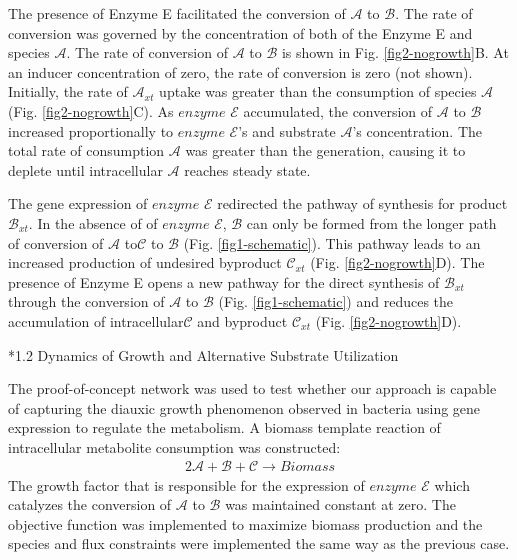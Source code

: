 \documentclass[12pt]{article}
\makeatletter
\renewcommand\subsection{\@startsection
	{subsection}{2}{0mm}
	{-0.05in}
	{-0.5\baselineskip}
	{\normalfont\normalsize\bfseries}}
\makeatother
\begin{document}
The presence of Enzyme E facilitated the conversion of $\mathcal{A}$ to $\mathcal{B}$. The rate of conversion was governed by the concentration of both of the Enzyme E and species $\mathcal{A}$. The rate of conversion of $\mathcal{A}$ to $\mathcal{B}$ is shown in Fig. \ref{fig2-nogrowth}B. At an inducer concentration of zero, the rate of conversion is zero (not shown). Initially, the rate of $\mathcal{A}_{xt}$ uptake was greater than the consumption of species $\mathcal{A}$ (Fig. \ref{fig2-nogrowth}C). As $enzyme$ $\mathcal{E}$ accumulated, the conversion of $\mathcal{A}$ to $\mathcal{B}$ increased proportionally to $enzyme$ $\mathcal{E}$’s and substrate $\mathcal{A}$’s concentration. The total rate of consumption $\mathcal{A}$ was greater than the generation, causing it to deplete until intracellular $\mathcal{A}$ reaches steady state. 

The gene expression of $enzyme$ $\mathcal{E}$ redirected the pathway of synthesis for product $\mathcal{B}_{xt}$. In the absence of of $enzyme$ $\mathcal{E}$, $\mathcal{B}$ can only be formed from the longer path of conversion of $\mathcal{A}$ to$\mathcal{C}$ to $\mathcal{B}$ (Fig. \ref{fig1-schematic}). This pathway leads to an increased production of undesired  byproduct $\mathcal{C}_{xt}$ (Fig. \ref{fig2-nogrowth}D). The presence of Enzyme E opens a new pathway for the direct synthesis of $\mathcal{B}_{xt}$ through the conversion of $\mathcal{A}$ to $\mathcal{B}$ (Fig. \ref{fig1-schematic}) and reduces the accumulation of intracellular$\mathcal{C}$ and byproduct $\mathcal{C}_{xt}$ (Fig. \ref{fig2-nogrowth}D). 


\subsection*{1.2 Dynamics of Growth and Alternative Substrate Utilization}

The proof-of-concept network was used to test whether our approach is capable of capturing the diauxic growth phenomenon observed in bacteria using gene expression to regulate the metabolism. A biomass template reaction of intracellular metabolite consumption was constructed:
\begin{equation}\label{eq:static_opt}
\begin{aligned}
2 \mathcal{A} + \mathcal{B} + \mathcal{C} \rightarrow Biomass
\end{aligned}
\end{equation} 
The growth factor that is responsible for the expression of $enzyme$ $\mathcal{E}$ which catalyzes the conversion of $\mathcal{A}$ to $\mathcal{B}$ was maintained constant at zero. The objective function was implemented to maximize biomass production and the species and flux constraints were implemented the same way as the previous case. 
\end{document}
